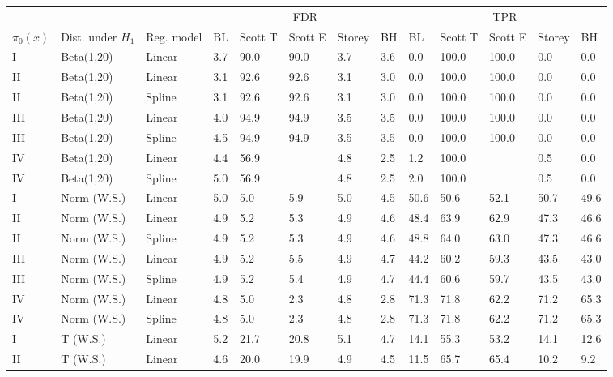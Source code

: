 \documentclass{article}\usepackage[]{graphicx}\usepackage[]{color}
\begin{document}
\begin{table}[ht]
\centering
\begin{tabular}{lll|lllll|lllll}
  \hline
  &&& \multicolumn{5}{c}{FDR} & \multicolumn{5}{c}{TPR}\\
 $\pi_0(x)$ &  Dist. under $H_1$ & Reg. model & BL & Scott T & Scott E & Storey & BH & BL & Scott T & Scott E & Storey & BH    \\
 \hline
I & Beta(1,20) & Linear & 3.7 & 90.0 & 90.0 & 3.7 & 3.6 & 0.0 & 100.0 & 100.0 & 0.0 & 0.0 \\ 
  II & Beta(1,20) & Linear & 3.1 & 92.6 & 92.6 & 3.1 & 3.0 & 0.0 & 100.0 & 100.0 & 0.0 & 0.0 \\ 
  II & Beta(1,20) & Spline & 3.1 & 92.6 & 92.6 & 3.1 & 3.0 & 0.0 & 100.0 & 100.0 & 0.0 & 0.0 \\ 
  III & Beta(1,20) & Linear & 4.0 & 94.9 & 94.9 & 3.5 & 3.5 & 0.0 & 100.0 & 100.0 & 0.0 & 0.0 \\ 
  III & Beta(1,20) & Spline & 4.5 & 94.9 & 94.9 & 3.5 & 3.5 & 0.0 & 100.0 & 100.0 & 0.0 & 0.0 \\ 
  IV & Beta(1,20) & Linear & 4.4 & 56.9 &  & 4.8 & 2.5 & 1.2 & 100.0 &  & 0.5 & 0.0 \\ 
  IV & Beta(1,20) & Spline & 5.0 & 56.9 &  & 4.8 & 2.5 & 2.0 & 100.0 &  & 0.5 & 0.0 \\ 
   \hline
I & Norm (W.S.) & Linear & 5.0 & 5.0 & 5.9 & 5.0 & 4.5 & 50.6 & 50.6 & 52.1 & 50.7 & 49.6 \\ 
  II & Norm (W.S.) & Linear & 4.9 & 5.2 & 5.3 & 4.9 & 4.6 & 48.4 & 63.9 & 62.9 & 47.3 & 46.6 \\ 
  II & Norm (W.S.) & Spline & 4.9 & 5.2 & 5.3 & 4.9 & 4.6 & 48.8 & 64.0 & 63.0 & 47.3 & 46.6 \\ 
  III & Norm (W.S.) & Linear & 4.9 & 5.2 & 5.5 & 4.9 & 4.7 & 44.2 & 60.2 & 59.3 & 43.5 & 43.0 \\ 
  III & Norm (W.S.) & Spline & 4.9 & 5.2 & 5.4 & 4.9 & 4.7 & 44.4 & 60.6 & 59.7 & 43.5 & 43.0 \\ 
  IV & Norm (W.S.) & Linear & 4.8 & 5.0 & 2.3 & 4.8 & 2.8 & 71.3 & 71.8 & 62.2 & 71.2 & 65.3 \\ 
  IV & Norm (W.S.) & Spline & 4.8 & 5.0 & 2.3 & 4.8 & 2.8 & 71.3 & 71.8 & 62.2 & 71.2 & 65.3 \\ 
   \hline
I & T (W.S.) & Linear & 5.2 & 21.7 & 20.8 & 5.1 & 4.7 & 14.1 & 55.3 & 53.2 & 14.1 & 12.6 \\ 
  II & T (W.S.) & Linear & 4.6 & 20.0 & 19.9 & 4.9 & 4.5 & 11.5 & 65.7 & 65.4 & 10.2 & 9.2 \\ 

\end{tabular}
\end{table}
\end{document}
